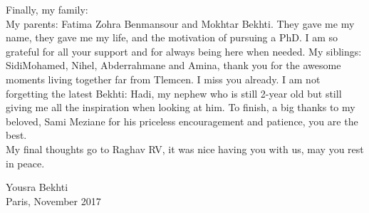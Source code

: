 \begin{acknowledgements}
Finally, my family: \\
My parents: Fatima Zohra Benmansour and Mokhtar Bekhti. They gave me my name, they gave me my life, and the motivation of pursuing a PhD. I am so grateful for all your support and for always being here when needed. My siblings: SidiMohamed, Nihel, Abderrahmane and Amina, thank you for the awesome moments living together far from Tlemcen. I miss you already. I am not forgetting the latest Bekhti: Hadi, my nephew who is still 2-year old but still giving me all the inspiration when looking at him. To finish, a big thanks to my beloved, Sami Meziane for his priceless encouragement and patience, you are the best.\\

My final thoughts go to Raghav RV, it was nice having you with us, may you rest in peace.

{\raggedleft Yousra Bekhti\\}%
{\raggedleft Paris, November 2017\\}
\end{acknowledgements}
\leavevmode\thispagestyle{empty}\newpage